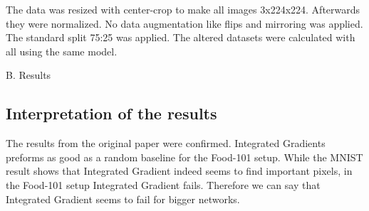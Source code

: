 The data was resized with center-crop to make all images 3x224x224. Afterwards they were normalized. No data augmentation like flips and mirroring was applied. The standard split 75:25 was applied. The altered datasets were calculated with all using the same model.

B. Results




\subsection{Interpretation of the results}

The results from the original paper were confirmed. Integrated Gradients preforms as good as a random baseline for the Food-101 setup. While the MNIST result shows that Integrated Gradient indeed seems to find important pixels, in the Food-101 setup Integrated Gradient fails. Therefore we can say that Integrated Gradient seems to fail for bigger networks.






